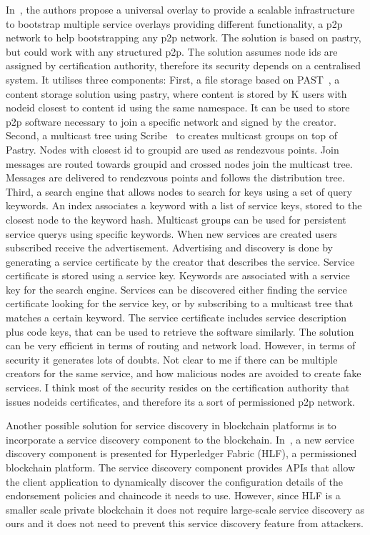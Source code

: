 In~\cite{ring}, the authors propose a  universal overlay to provide a scalable infrastructure to bootstrap multiple service overlays providing different functionality, \ie a p2p network to help bootstrapping any p2p network.
The solution is based on pastry,  but could work with any structured p2p.  The solution assumes node ids are assigned by certification authority,  therefore its security depends on a centralised system.  It utilises three components:
First, a file storage based on PAST~\cite{past}, a content storage solution using pastry, where content is stored by K users with nodeid closest to content id using the same namespace. It can be used to store p2p software necessary to join a specific network and  signed by the creator. 
Second, a multicast tree using Scribe~\cite{scribe} to creates multicast groups on top of Pastry. Nodes with closest id to groupid are used as rendezvous points.  Join messages are routed towards groupid and crossed nodes join the multicast tree. Messages are delivered to rendezvous points and follows the distribution tree. 
Third, a search engine that allows nodes to search for keys using a set of query keywords. An index associates a keyword with a list of service keys, stored to the closest node to the keyword hash. Multicast groups can be used for persistent service querys using specific keywords. When new services are created users subscribed receive the advertisement.
Advertising and discovery is done by generating a service certificate by the creator that describes the service. Service certificate is stored using a service key. Keywords are associated with a service key for the search engine.
Services can be discovered either finding the service certificate looking for the service key, or by subscribing to a multicast tree that matches a certain keyword. The service certificate includes service description plus code keys, that can be used to retrieve the software similarly.
The solution can be very efficient in terms of routing and network load. However, in terms of security it generates lots of doubts. Not clear to me if there can be multiple creators for the same service, and how malicious nodes are avoided to create fake services. I think most of the security resides on the certification authority that issues nodeids certificates, and therefore its a sort of permissioned p2p network. 

Another possible solution for service discovery in blockchain platforms is to incorporate a service discovery component to the blockchain. 
In~\cite{manevich2019endorsement}, a new service discovery component is presented for  Hyperledger Fabric (HLF), a permissioned blockchain platform.
The service discovery component provides APIs that allow the client application to dynamically discover the configuration details of the endorsement policies and chaincode it needs to use.
However, since HLF is a smaller scale private blockchain it does not require large-scale service discovery as ours and it does not need to prevent this service discovery feature from attackers.

